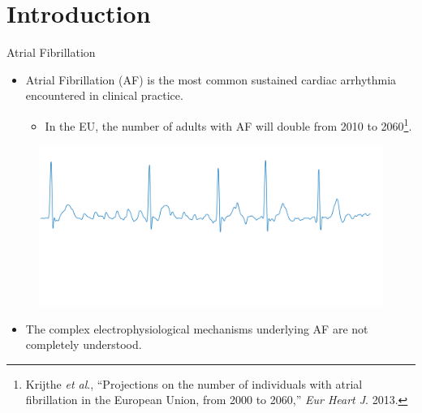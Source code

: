 \documentclass{beamer}
\begin{document}
	\begin{frame}
		\tableofcontents
	\end{frame}

\section{Introduction} 
	
	\begin{frame}{Atrial Fibrillation}	
		
		\begin{itemize}
			\item Atrial Fibrillation (AF) is the most common sustained cardiac arrhythmia encountered in clinical practice.
			\begin{itemize}
				\item  In the EU, the number of adults with AF will double from 2010 to 2060\footnote{Krijthe \textit{et al}., ``Projections on the number of individuals with atrial fibrillation in the European Union, from 2000 to 2060,'' \textit{Eur Heart J}. 2013.}.
			\end{itemize}
		\end{itemize}
		\begin{figure}
			\centering
			\includegraphics[scale=0.2]{fig/AF_ECG-eps-converted-to.pdf}
		\end{figure}
		\vspace{-0.8in}	
		\begin{itemize}
			\item The complex electrophysiological mechanisms underlying AF are not completely understood.
		\end{itemize}
	\end{frame}
\end{document}
